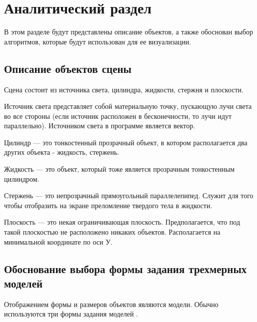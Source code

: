 \chapter{Аналитический раздел}

В этом разделе будут представлены описание объектов, а также обоснован выбор алгоритмов, которые будут использован для ее визуализации.

\section{Описание объектов сцены}

Сцена состоит из источника света, цилиндра, жидкости, стержня и плоскости.

Источник света представляет собой материальную точку, пускающую лучи света во все стороны (если источник расположен в бесконечности, то лучи идут параллельно). Источником света в программе является вектор.
 
Цилиндр --- это тонкостенный прозрачный объект, в котором располагается два других объекта - жидкость, стержень.
  
Жидкость --- это объект, который тоже является прозрачным тонкостенным цилиндром.

Стержень --- это непрозрачный прямоугольный параллелепипед. Служит для того чтобы отобразить на экране преломление твердого тела в жидкости.

Плоскость --- это некая ограничивающая плоскость. Предполагается, что под такой плоскостью не расположено никаких объектов. Располагается на минимальной координате по оси У. 

\section{Обоснование выбора формы задания трехмерных моделей}

Отображением формы и размеров объектов являются модели. 
Обычно используются три формы задания моделей \cite{Rodjers}.

